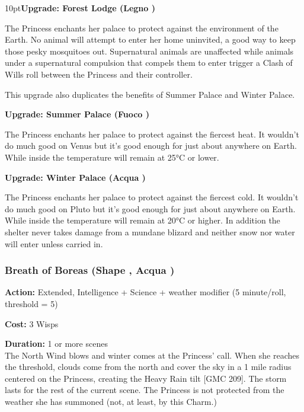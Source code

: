 \begin{myindentpar}{10pt}\textbf{Upgrade: Forest Lodge (Legno \textbullet)}

The Princess enchants her palace to protect against the environment of the Earth. No animal will attempt to enter her home uninvited, a good way to keep those pesky mosquitoes out. Supernatural animals are unaffected while animals under a supernatural compulsion that compels them to enter trigger a Clash of Wills roll between the Princess and their controller. 

This upgrade also duplicates the benefits of Summer Palace and Winter Palace.

\textbf{Upgrade: Summer Palace (Fuoco \textbullet\textbullet)}

The Princess enchants her palace to protect against the fiercest heat. It wouldn't do much good on Venus but it's good enough for just about anywhere on Earth. While inside the temperature will remain at 25°C or lower.

\textbf{Upgrade: Winter Palace (Acqua \textbullet\textbullet)}

The Princess enchants her palace to protect against the fiercest cold. It wouldn't do much good on Pluto but it's good enough for just about anywhere on Earth. While inside the temperature will remain at 20°C or higher. In addition the shelter never takes damage from a mundane blizard and neither snow nor water will enter unless carried in.

\end{myindentpar}

\subsubsection*{Breath of Boreas (Shape \textbullet\textbullet\textbullet\textbullet, Acqua \textbullet\textbullet\textbullet)}

\noindent \textbf{Action:} Extended, Intelligence + Science + weather modifier (5 minute/roll, threshold = 5)

\noindent \textbf{Cost:} 3 Wisps

\noindent \textbf{Duration:} 1 or more scenes\\

\noindent The North Wind blows and winter comes at the Princess' call. When she reaches the threshold, clouds come from the north and cover the sky in a 1 mile radius centered on the Princess, creating the Heavy Rain tilt [GMC 209]. The storm lasts for the rest of the current scene. The Princess is not protected from the weather she has summoned (not, at least, by this Charm.)

